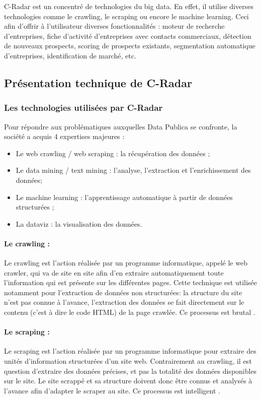         C-Radar est un concentré de technologies du big data. En effet, il utilise diverses technologies comme le crawling, le scraping ou encore le machine learning. Ceci afin d'offrir à l'utilisateur diverses fonctionnalités : moteur de recherche d'entreprises, fiche d'activité d'entreprises avec contacts commerciaux, détection de nouveaux prospects, scoring de prospects existants, segmentation automatique d'entreprises, identification de marché, etc.

    \subsection{Présentation technique de C-Radar}
        \subsubsection{Les technologies utilisées par C-Radar}
            Pour répondre aux problématiques auxquelles Data Publica se confronte, la société a acquis 4 expertises majeures :
            \begin{itemize}
                \item Le web crawling / web scraping : la récupération des données ;
                \item Le data mining / text mining : l'analyse, l’extraction et l’enrichissement des données;
                \item Le machine learning : l'apprentissage automatique à partir de données structurées ;
                \item La dataviz : la visualisation des données.
            \end{itemize}

            \paragraph{Le crawling :}
                Le crawling est l’action réalisée par un programme informatique, appelé le web crawler, qui va de site en site afin d’en extraire automatiquement toute l’information qui est présente sur les différentes pages. Cette technique est utilisée notamment pour l’extraction de données non structurées: la structure du site n’est pas connue à l’avance, l’extraction des données se fait directement sur le contenu (c’est à dire le code HTML) de la page crawlée. Ce processus est \og brutal \fg.

            \paragraph{Le scraping :}
                Le scraping est l’action réalisée par un programme informatique pour extraire des unités d’information structurées d’un site web. Contrairement au crawling, il est question d’extraire des données précises, et pas la totalité des données disponibles sur le site. Le site \og scrappé \fg et sa structure doivent donc être connus et analysés à l’avance afin d’adapter le scraper au site. Ce processus est \og intelligent \fg.

